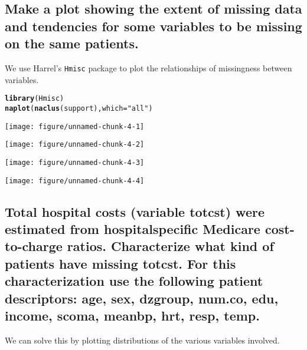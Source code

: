 \documentclass[headinclude=false]{scrartcl}\usepackage[]{graphicx}\usepackage[]{color}
\makeatletter
\def\maxwidth{ %
  \ifdim\Gin@nat@width>\linewidth
    \linewidth
  \else
    \Gin@nat@width
  \fi
}
\newcommand{\hlstr}[1]{\textcolor[rgb]{0.192,0.494,0.8}{#1}}%
\newcommand{\hlstd}[1]{\textcolor[rgb]{0.345,0.345,0.345}{#1}}%
\newcommand{\hlkwc}[1]{\textcolor[rgb]{0.333,0.667,0.333}{#1}}%
\newcommand{\hlkwd}[1]{\textcolor[rgb]{0.737,0.353,0.396}{\textbf{#1}}}%
\newenvironment{kframe}{%
 \def\at@end@of@kframe{}%
 \ifinner\ifhmode%
  \def\at@end@of@kframe{\end{minipage}}%
  \begin{minipage}{\columnwidth}%
 \fi\fi%
 \def\FrameCommand##1{\hskip\@totalleftmargin \hskip-\fboxsep
 \colorbox{shadecolor}{##1}\hskip-\fboxsep
     \hskip-\linewidth \hskip-\@totalleftmargin \hskip\columnwidth}%
 \MakeFramed {\advance\hsize-\width
   \@totalleftmargin\z@ \linewidth\hsize
   \@setminipage}}%
 {\par\unskip\endMakeFramed%
 \at@end@of@kframe}
\newenvironment{knitrout}{}{} %
\makeatother
\begin{document}
\subsection{Make a plot showing the extent of missing data and tendencies for some
variables to be missing on the same patients.}

We use Harrel's \texttt{Hmisc} package to plot the relationships of
missingness between variables.

\begin{knitrout}
\color{fgcolor}\begin{kframe}
\begin{alltt}
\hlkwd{library}\hlstd{(Hmisc)}
\hlkwd{naplot}\hlstd{(}\hlkwd{naclus}\hlstd{(support),} \hlkwc{which} \hlstd{=} \hlstr{"all"}\hlstd{)}
\end{alltt}
\end{kframe}

{\centering \texttt{[image: figure/unnamed-chunk-4-1]} 

}




{\centering \texttt{[image: figure/unnamed-chunk-4-2]} 

}




{\centering \texttt{[image: figure/unnamed-chunk-4-3]} 

}




{\centering \texttt{[image: figure/unnamed-chunk-4-4]} 

}



\end{knitrout}

\subsection{Total hospital costs (variable totcst) were estimated from 
hospitalspecific Medicare cost-to-charge ratios. Characterize what kind of
patients have missing totcst. For this characterization use the following
patient descriptors: age, sex, dzgroup, num.co, edu, income, scoma,
meanbp, hrt, resp, temp.}

We can solve this by plotting distributions of the various variables involved.
\end{document}
